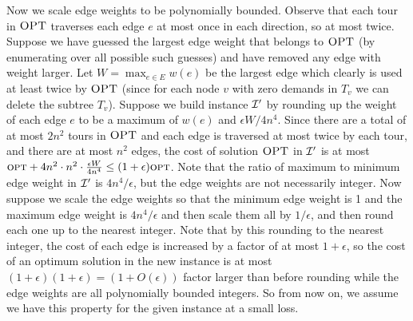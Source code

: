 \documentclass[twoside,leqno]{article}
\newcommand{\calI}{{\cal I}}
\newcommand{\opt}{\mbox{\sc opt}}
\newcommand{\OPT}{\mbox{\sc OPT}}
\newcommand{\eps}{\epsilon}
\begin{document}
Now we scale edge weights to be polynomially bounded.
Observe that each tour in $\OPT$ traverses each edge $e$ at most once in each direction, so at most twice.
Suppose we have guessed the largest edge weight that belongs to $\OPT$ (by enumerating over all possible such guesses) and have removed any edge with weight larger. Let $W=\max_{e\in E} w(e)$ be the largest edge which clearly is used at least twice by $\OPT$ (since for each node $v$ with zero demands in $T_v$ we can delete the subtree $T_v$).
Suppose we build instance $\calI'$ by rounding up the weight of each edge $e$ to be a maximum of
$w(e)$ and $\eps W/4n^4$. Since there are a total of at most $2n^2$ tours in $\OPT$ and each edge
is traversed at most twice by each tour, and there are at most $n^2$ edges,
the cost of solution $\OPT$ in $\calI'$ is at most
$\opt+4n^2\cdot n^2\cdot\frac{\eps W}{4n^4} \leq (1+\eps )\opt$. Note that the ratio of maximum to minimum edge weight in $\calI'$ is $4n^4/\eps$, but the edge weights are not necessarily integer.
Now suppose we scale the edge weights so that the minimum edge weight is 1 and the maximum edge weight is $4n^4/\eps$ and
then scale them all by $1/\eps$, and then round each one up to the nearest integer.
Note that by this rounding to the nearest integer,
the cost of each edge is increased by a factor of at most $1+\eps$, so the cost of an optimum solution in
the new instance is at most $(1+\eps)(1+\eps)=(1+O(\eps))$ factor larger than before rounding while the edge weights are all polynomially bounded integers.
So from now on, we assume we have this property for the given instance at a small loss.
\end{document}
